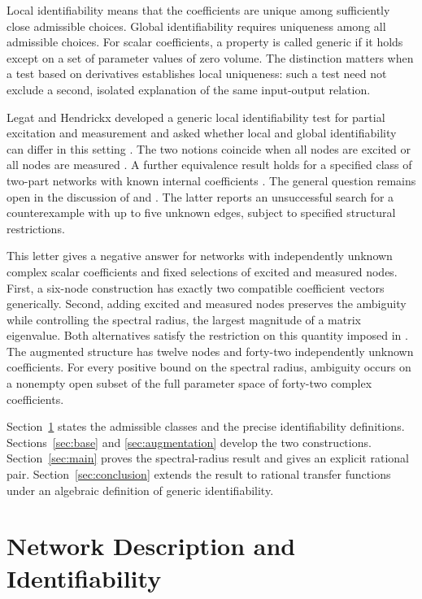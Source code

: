 \documentclass[letterpaper,10pt,conference]{ieeeconf}
\newcommand{\aicite}{\texorpdfstring{\protect\cite{codex}}{}}
\begin{document}
Local identifiability means that the coefficients are unique among
sufficiently close admissible choices. Global identifiability requires
uniqueness among all admissible choices. For scalar coefficients,
a property is called generic if it holds except on a set of parameter
values of zero volume.
The distinction matters when a test based on derivatives establishes
local uniqueness: such a test need not exclude a second, isolated
explanation of the same input-output relation.

Legat and Hendrickx developed a generic local identifiability test for
partial excitation and measurement and asked whether local and global
identifiability can differ in this setting \cite{LH20}. The two notions
coincide when all nodes are excited or all nodes are measured
\cite{LH24}. A further equivalence result holds for a specified class
of two-part networks with known internal coefficients \cite{LH23}.
The general question remains open in the
discussion of \cite[Sec.~II-C]{LH24} and
\cite[Sec.~12.2]{L25}. The latter reports an unsuccessful search for a
counterexample with up to five unknown edges, subject to specified
structural restrictions.

This letter gives a negative answer for networks with independently
unknown complex scalar coefficients and fixed selections of excited and measured
nodes. First, a six-node construction has exactly two compatible
coefficient vectors generically. Second, adding excited and measured
nodes preserves the
ambiguity while controlling the spectral radius, the largest magnitude
of a matrix eigenvalue. Both alternatives satisfy the restriction on this
quantity imposed in \cite{LH24}. The augmented structure has twelve
nodes and forty-two independently unknown coefficients. For every positive
bound on the spectral radius, ambiguity occurs on a nonempty open subset
of the full parameter space of forty-two complex coefficients.

Section~\ref{sec:setting} states the admissible classes and the precise
identifiability definitions. Sections~\ref{sec:base} and
\ref{sec:augmentation} develop the two constructions.
Section~\ref{sec:main} proves the spectral-radius result and gives an
explicit rational pair. Section~\ref{sec:conclusion} extends the result
to rational transfer functions under an algebraic definition of generic
identifiability.

\section{Network Description and Identifiability \aicite}
\label{sec:setting}
\end{document}
